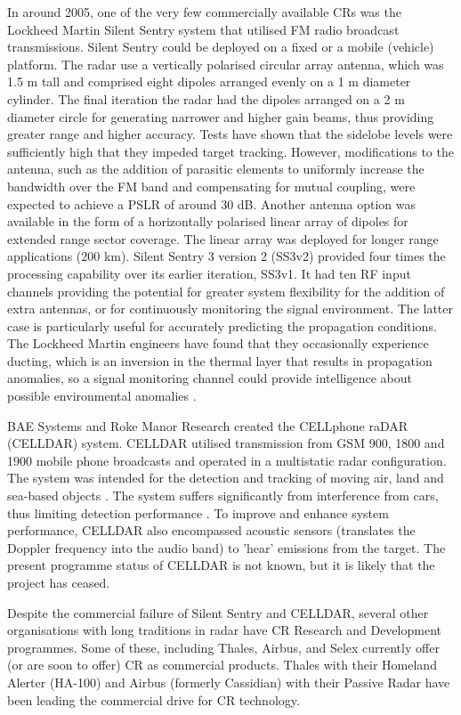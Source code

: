 In around 2005, one of the very few commercially available CRs was the Lockheed Martin Silent Sentry system that utilised FM radio broadcast transmissions.  Silent Sentry could be deployed on a fixed or a mobile (vehicle) platform.  The radar use a vertically polarised circular array antenna, which was 1.5 m tall and comprised eight dipoles arranged evenly on a 1 m diameter cylinder.  The final iteration the radar had the dipoles arranged on a 2 m diameter circle for generating narrower and higher gain beams, thus providing greater range and higher accuracy.  Tests have shown that the sidelobe levels were sufficiently high that they impeded target tracking.  However, modifications to the antenna, such as the addition of parasitic elements to uniformly increase the bandwidth over the FM band and compensating for mutual coupling, were expected to achieve a PSLR of around 30 dB.  Another antenna option was available in the form of a horizontally polarised linear array of dipoles for extended range sector coverage.  The linear array was deployed for longer range applications (200 km).  Silent Sentry 3 version 2 (SS3v2) provided four times the processing capability over its earlier iteration, SS3v1.  It had ten RF input channels providing the potential for greater system flexibility for the addition of extra antennas, or for continuously monitoring the signal environment.  The latter case is particularly useful for accurately predicting the propagation conditions.  The Lockheed Martin engineers have found that they occasionally experience ducting, which is an inversion in the thermal layer that results in propagation anomalies, so a signal monitoring channel could provide intelligence about possible environmental anomalies \cite{lockheed}.

BAE Systems and Roke Manor Research created the CELLphone raDAR (CELLDAR) system. CELLDAR utilised transmission from GSM 900, 1800 and 1900 mobile phone broadcasts and operated in a multistatic radar configuration. The system was intended for the detection and tracking of moving air, land and sea-based objects \cite{celldar}.  The system suffers significantly from interference from cars, thus limiting detection performance \cite{rickett}.  To improve and enhance system performance, CELLDAR also encompassed acoustic sensors (translates the Doppler frequency into the audio band) to 'hear' emissions from the target. The present programme status of CELLDAR is not known, but it is likely that the project has ceased.

Despite the commercial failure of Silent Sentry and CELLDAR, several other organisations with long traditions in radar have CR Research and Development programmes. Some of these, including Thales, Airbus, and Selex currently offer (or are soon to offer) CR as commercial products. Thales with their Homeland Alerter (HA-100) and Airbus (formerly Cassidian) with their Passive Radar have been leading the commercial drive for CR technology.

